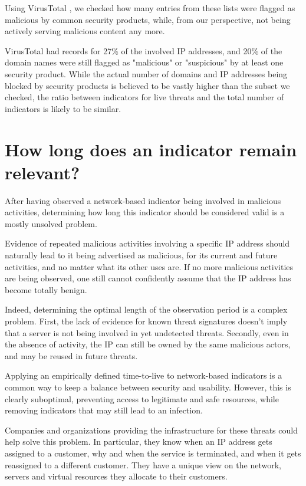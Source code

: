\documentclass[conference]{IEEEtran}
\begin{document}
Using VirusTotal \cite{virustotal}, we checked how many entries from these lists were flagged as malicious by common security products, while, from our perspective, not being actively serving malicious content any more.

VirusTotal had records for 27\% of the involved IP addresses, and 20\% of the domain names were still flagged as "malicious" or "suspicious" by at least one security product. While the actual number of domains and IP addresses being blocked by security products is believed to be vastly higher than the subset we checked, the ratio between indicators for live threats and the total number of indicators is likely to be similar.

\section{How long does an indicator remain relevant?}

After having observed a network-based indicator being involved in malicious activities, determining how long this indicator should be considered valid is a mostly unsolved problem.

Evidence of repeated malicious activities involving a specific IP address should naturally lead to it being advertised as malicious, for its current and future activities, and no matter what its other uses are.
If no more malicious activities are being observed, one still cannot confidently assume that the IP address has become totally benign.

Indeed, determining the optimal length of the observation period is a complex problem. First, the lack of evidence for known threat signatures doesn't imply that a server is not being involved in yet undetected threats. Secondly, even in the absence of activity, the IP can still be owned by the same malicious actors, and may be reused in future threats.

Applying an empirically defined time-to-live to network-based indicators is a common way to keep a balance between security and usability. However, this is clearly suboptimal, preventing access to legitimate and safe resources, while removing indicators that may still lead to an infection.

Companies and organizations providing the infrastructure for these threats could help solve this problem. In particular, they know when an IP address gets assigned to a customer, why and when the service is terminated, and when it gets reassigned to a different customer. They have a unique view on the network, servers and virtual resources they allocate to their customers.
\end{document}
